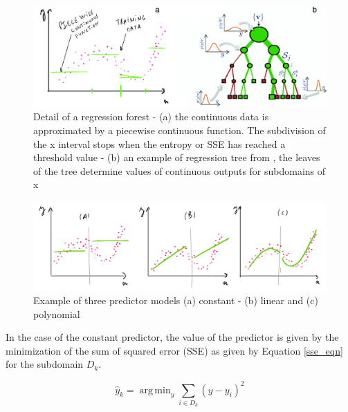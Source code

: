 \documentclass{article} %
\DeclareMathOperator*{\argmin}{arg\,min}
\begin{document}
\begin{figure}[h]
	\centering
	\includegraphics[width=1\textwidth]{rf}
	\caption{Detail of a regression forest - (a) the continuous data is approximated by a piecewise continuous function. The subdivision of the x interval stops when the entropy or SSE has reached a threshold value - (b) an example of regression tree from 	\cite{criminisi2011decision}, the leaves of the tree determine values of continuous outputs for subdomains of x}
	\label{fig:rf}
\end{figure}

\begin{figure}[h]
	\centering
	\includegraphics[width=1\textwidth]{rfpredictors}
	\caption{Example of three predictor models (a) constant - (b) linear and (c) polynomial}
	\label{fig:RFpredictors}
\end{figure}

In the case of the constant predictor, the value of the predictor is given by the minimization of the sum of squared error (SSE) as given by Equation \ref{sse_eqn} for the subdomain $D_k$. 

\begin{equation} \label{sse_eqn}
\hat{y}_k = \argmin_y \sum_{i \in D_k} (y-y_i)^2
\end{equation}
\end{document}
